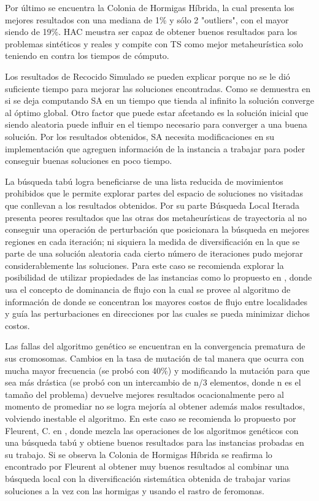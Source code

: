 \documentclass{ci5652}
\begin{document}
Por último se encuentra la Colonia de Hormigas Híbrida, la cual presenta los mejores resultados con una mediana de 1\% y sólo 2 "outliers", con el mayor siendo de 19\%. HAC meustra ser capaz de obtener buenos resultados para los problemas sintéticos y reales y compite con TS como mejor metaheurística solo teniendo en contra los tiempos de cómputo.
 
Los resultados de Recocido Simulado se pueden explicar porque no se le dió suficiente tiempo para mejorar las soluciones encontradas. Como se demuestra en \cite{7} si se deja computando SA en un tiempo que tienda al infinito la solución converge al óptimo global. Otro factor que puede estar afcetando es la solución inicial que siendo aleatoria puede influir en el tiempo necesario para converger a una buena solución. Por los resultados obtenidos, SA necesita modificaciones en su implementación que agreguen información de la instancia a trabajar para poder conseguir buenas soluciones en poco tiempo.

La búsqueda tabú logra beneficiarse de una lista reducida de movimientos prohibidos que le permite explorar partes del espacio de soluciones no visitadas que conllevan a los resultados obtenidos. Por su parte Búsqueda Local Iterada presenta peores resultados que las otras dos metaheurísticas de trayectoria al no conseguir una operación de perturbación que posicionara la búsqueda en mejores regiones en cada iteración; ni siquiera la medida de diversificación en la que se parte de una solución aleatoria cada cierto número de iteraciones pudo mejorar considerablemente las soluciones. Para este caso se recomienda explorar la posibilidad de utilizar propiedades de las instancias como  lo propuesto en \cite{14}, donde usa el concepto de dominancia de flujo con la cual se provee al algoritmo de información de donde se concentran los mayores costos de flujo entre localidades y guía las perturbaciones en direcciones por las cuales se pueda minimizar dichos costos.

Las fallas del algoritmo genético se encuentran en la convergencia prematura de sus cromosomas. Cambios en la tasa de mutación de tal manera que ocurra con mucha mayor frecuencia (se probó con 40\%) y modificando la mutación para que sea más drástica (se probó con un intercambio de n/3 elementos, donde n es el tamaño del problema) devuelve mejores resultados ocacionalmente pero al momento de promediar no se logra mejoría al obtener además malos resultados, volviendo inestable el algoritmo. En este caso se recomienda lo propuesto por Fleurent, C. en \cite{16}, donde mezcla las operaciones de los algoritmos genéticos con una búsqueda tabú y obtiene buenos resultados para las instancias probadas en su trabajo. Si se observa la Colonia de Hormigas Híbrida se reafirma lo encontrado por Fleurent al obtener muy buenos resultados al combinar una búsqueda local con la diversificación sistemática obtenida de trabajar varias soluciones a la vez con las hormigas y usando el rastro de feromonas. 
\end{document}
